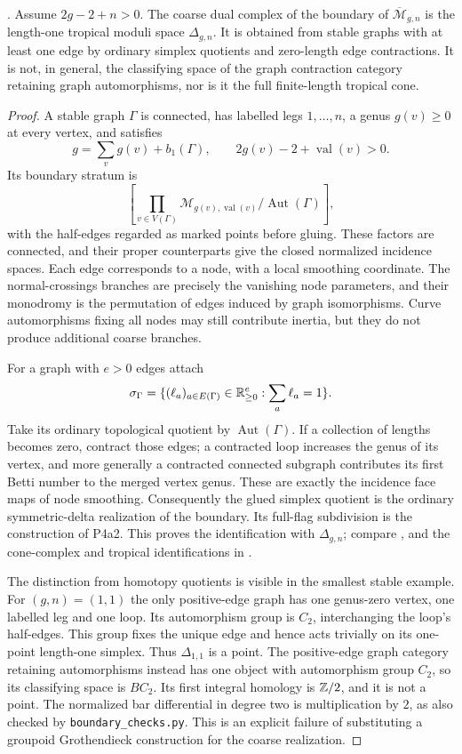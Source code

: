 \begin{proposition}
\label{P4d1}
. Assume $2g-2+n>0$. The coarse dual complex of the boundary of $\overline{\mathcal M}_{g,n}$ is the length-one tropical moduli space $\Delta_{g,n}$. It is obtained from stable graphs with at least one edge by ordinary simplex quotients and zero-length edge contractions. It is not, in general, the classifying space of the graph contraction category retaining graph automorphisms, nor is it the full finite-length tropical cone.
\end{proposition}
\begin{proof}
A stable graph $\Gamma$ is connected, has labelled legs $1,\ldots,n$, a genus $g(v)\ge0$ at every vertex, and satisfies
\[
 g=\sum_vg(v)+b_1(\Gamma),\qquad
 2g(v)-2+\operatorname{val}(v)>0.
\]
Its boundary stratum is
\[
 \left[\prod_{v\in V(\Gamma)}
 \mathcal M_{g(v),\operatorname{val}(v)}
 \big/\operatorname{Aut}(\Gamma)\right],
\]
with the half-edges regarded as marked points before gluing. These factors are connected, and their proper counterparts give the closed normalized incidence spaces. Each edge corresponds to a node, with a local smoothing coordinate. The normal-crossings branches are precisely the vanishing node parameters, and their monodromy is the permutation of edges induced by graph isomorphisms. Curve automorphisms fixing all nodes may still contribute inertia, but they do not produce additional coarse branches.

For a graph with $e>0$ edges attach
\[
 \sigma_\Gamma=
 \{(\ell_a)_{a\in E(\Gamma)}\in\mathbb R_{\ge0}^{e}:
                   \sum_a\ell_a=1\}.
\]
Take its ordinary topological quotient by $\operatorname{Aut}(\Gamma)$. If a collection of lengths becomes zero, contract those edges; a contracted loop increases the genus of its vertex, and more generally a contracted connected subgraph contributes its first Betti number to the merged vertex genus. These are exactly the incidence face maps of node smoothing. Consequently the glued simplex quotient is the ordinary symmetric-delta realization of the boundary. Its full-flag subdivision is the construction of P4a2. This proves the identification with $\Delta_{g,n}$; compare \cite[Definition~5.2, Lemma~5.4, Corollaries~5.6--5.7 and Theorem~5.8]{CGP2021}, and the cone-complex and tropical identifications in \cite[Theorem~1.2.1, Corollary~7.2.2 and \S7.3]{ACP2015}.

The distinction from homotopy quotients is visible in the smallest stable example. For $(g,n)=(1,1)$ the only positive-edge graph has one genus-zero vertex, one labelled leg and one loop. Its automorphism group is $C_2$, interchanging the loop's half-edges. This group fixes the unique edge and hence acts trivially on its one-point length-one simplex. Thus $\Delta_{1,1}$ is a point. The positive-edge graph category retaining automorphisms instead has one object with automorphism group $C_2$, so its classifying space is $BC_2$. Its first integral homology is $\mathbb Z/2$, and it is not a point. The normalized bar differential in degree two is multiplication by $2$, as also checked by \texttt{boundary\_checks.py}. This is an explicit failure of substituting a groupoid Grothendieck construction for the coarse realization.


\end{proof}
